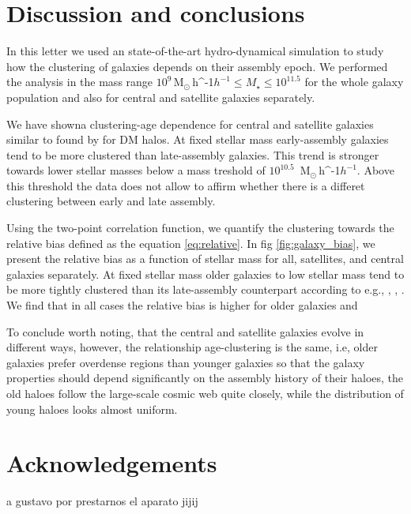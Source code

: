 \documentclass[fleqn,usenatbib]{mnras}
\newcommand{\Msunh}{\,{\rm M}$_{\odot}$\,\ifmmode h^{-1}\else $h^{-1}$\fi}
\begin{document}
\section{Discussion and conclusions}
\label{sec:conclu}

In this letter we used an state-of-the-art hydro-dynamical simulation
to study how the clustering of galaxies depends on their assembly
epoch.
We performed the analysis in the mass range $10^{9}$\Msunh $\leq
M_{\star} \leq 10^{11.5}$ for the whole galaxy population and also for 
central and satellite galaxies separately.

We have showna clustering-age  dependence for central and
satellite galaxies similar to found by \citet{2005MNRAS.363L..66G}
for DM halos. 
At fixed stellar mass early-assembly galaxies tend to be more
clustered than late-assembly galaxies.
This trend is stronger towards lower stellar masses below a mass
treshold of $10^{10.5}$
\Msunh. 
Above this threshold the data does not allow to affirm whether there
is a differet clustering between early and late assembly. 


Using the two-point correlation function, we quantify the clustering
towards the relative bias defined as the equation
\ref{eq:relative}. In fig \ref{fig:galaxy_bias}, we present the
relative bias as a function of stellar mass for all, satellites, and
central galaxies separately. At fixed stellar mass older galaxies to
low stellar mass tend to be more tightly clustered than its
late-assembly counterpart according to e.g., \citep{Lacerna_2014},
\citep{2013MNRAS.433..515W}, \citep{2009MNRAS.394.2229Z}. We find that
in all cases the relative bias is higher for older galaxies and 


To conclude worth noting, that the central and satellite galaxies
evolve in different ways, however, the relationship age-clustering is
the same, i.e, older galaxies prefer overdense regions than younger
galaxies so that the galaxy properties should depend significantly on
the assembly history of their haloes, the old haloes follow the
large-scale cosmic web quite closely, while the distribution of young
haloes looks almost uniform. 





\section*{Acknowledgements}

a gustavo por prestarnos el aparato jijij






\bsp	%
\label{lastpage}
\end{document}
